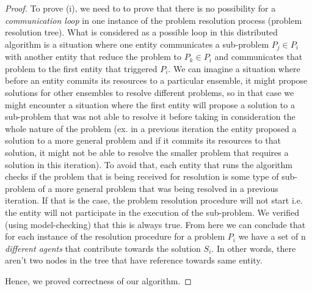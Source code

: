 \documentclass[journal]{IEEEtran}
\theoremstyle{definition}
\begin{document}
\begin{proof}
To prove (i), we need to to prove that there is no possibility for a \textit{communication loop} in one instance of the problem resolution process (problem resolution tree).
What is considered as a possible loop in this distributed algorithm is a situation where one entity communicates a  sub-problem $P_j \in P_i$ with another entity that reduce the problem to $P_k \in P_i$ and communicates that problem to the first entity that triggered $P_i$. We can imagine a situation where before an entity commits its resources to a particular ensemble, it might propose solutions for other ensembles to resolve different problems, so in that case we might encounter a situation where the first entity will propose a solution to a sub-problem that was not able to resolve it before taking in consideration the whole nature of the problem (ex. in a previous iteration the entity proposed a solution to a more general problem and if it commits its resources to that solution, it might not be able to resolve the smaller problem that requires a solution in this iteration). To avoid that, each entity that runs the algorithm checks if the problem that is being received for resolution is some type of sub-problem of a more general problem that was being resolved in a previous iteration. If that is the case, the problem resolution procedure will not start i.e. the entity will not participate in the execution of the sub-problem.
We verified (using model-checking) that this is always true. From here we can conclude that for each instance of the resolution procedure for a problem $P_i$ we have a set of n \textit{different agents} that contribute towards the solution $S_i$. In other words, there aren't two nodes in the tree that have reference towards same entity.









Hence, we proved correctness of our algorithm.

\end{proof}
\end{document}
